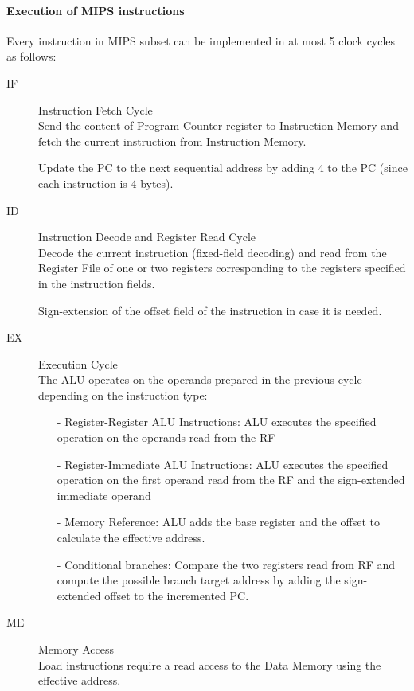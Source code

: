 \paragraph{Execution of MIPS instructions} Every instruction in MIPS subset can be implemented in at most 5 clock
cycles as follows:
\begin{description}
    \item[IF] Instruction Fetch Cycle\\
        Send the content of Program Counter register to Instruction Memory and fetch the
        current instruction from Instruction Memory.

        Update the PC to the next sequential address by adding 4 to the PC (since each instruction is 4 bytes).

    \item[ID] Instruction Decode and Register Read Cycle\\
        Decode the current instruction (fixed-field decoding)
        and read from the Register File of one or two registers
        corresponding to the registers specified in the
        instruction fields.

        Sign-extension of the offset field of the instruction in
        case it is needed.

    \item[EX] Execution Cycle\\
    The ALU operates on the operands prepared in the
    previous cycle depending on the instruction type:
    \begin{itemize}
        \item[-] Register-Register ALU Instructions: ALU executes the specified operation on the operands read
        from the RF
        \item[-] Register-Immediate ALU Instructions:
        ALU executes the specified operation on the first operand
        read from the RF and the sign-extended immediate operand
        \item[-] Memory Reference:
        ALU adds the base register and the offset to calculate the
        effective address.
        \item[-] Conditional branches:
        Compare the two registers read from RF and compute the
        possible branch target address by adding the sign-
        extended offset to the incremented PC\@.
    \end{itemize}


    \item[ME] Memory Access\\
        Load instructions require a read access to the Data
        Memory using the effective address.


\end{description}
